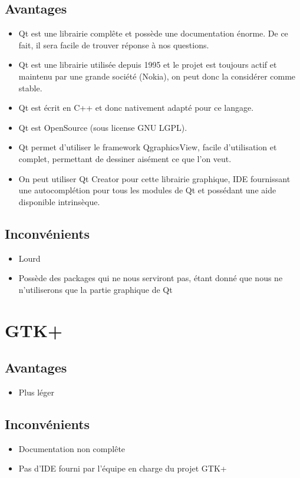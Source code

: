\documentclass[a4paper]{report}
\begin{document}
\subsection{Avantages}
\begin{itemize}
    \item Qt est une librairie complête et possède une documentation énorme. De ce fait, il sera facile de trouver réponse à nos questions.
    \item Qt est une librairie utilisée depuis 1995 et le projet est toujours actif et maintenu par une grande société (Nokia), on peut donc la considérer comme stable.
    \item Qt est écrit en C++ et donc nativement adapté pour ce langage.
    \item Qt est OpenSource (sous license GNU LGPL).
    \item Qt permet d'utiliser le framework QgraphicsView, facile d'utilisation et complet, permettant de dessiner aisément ce que l'on veut.
    \item On peut utiliser Qt Creator pour cette librairie graphique, IDE fournissant une autocomplétion pour tous les modules de Qt et possédant une aide disponible intrinsèque.
\end{itemize}
\subsection{Inconvénients}
\begin{itemize}
    \item Lourd
    \item Possède des packages qui ne nous serviront pas, étant donné que nous ne n'utiliserons que la partie graphique de Qt
\end{itemize}
\section{GTK+}
\subsection{Avantages}
\begin{itemize}
    \item Plus léger
\end{itemize}
\subsection{Inconvénients}
\begin{itemize}
    \item Documentation non complête
    \item Pas d'IDE fourni par l'équipe en charge du projet GTK+
\end{itemize}
\end{document}
